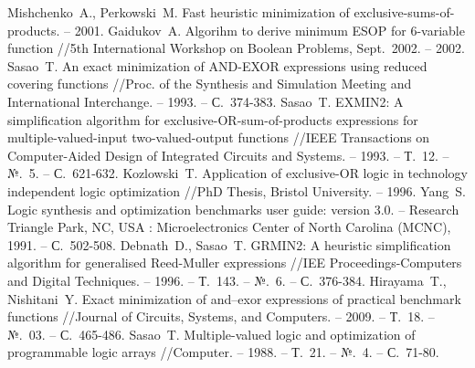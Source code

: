 \documentclass[a4paper,12pt,titlepage,finall]{article}
\begin{document}
\begin{raggedright}
\begin{thebibliography}{99}
     Mishchenko~A., Perkowski~M. Fast heuristic minimization of exclusive-sums-of-products. – 2001.
     Gaidukov~A. Algorihm to derive minimum ESOP for 6-variable function //5th International Workshop on Boolean Problems, Sept.~2002. – 2002.
     Sasao~T. An exact minimization of AND-EXOR expressions using reduced covering functions //Proc. of the Synthesis and Simulation Meeting and International Interchange. – 1993. – С.~374-383.
     Sasao~T. EXMIN2: A simplification algorithm for exclusive-OR-sum-of-products expressions for multiple-valued-input two-valued-output functions //IEEE Transactions on Computer-Aided Design of Integrated Circuits and Systems. – 1993. – Т.~12. – №.~5. – С.~621-632.
     Kozlowski~T. Application of exclusive-OR logic in technology independent logic optimization //PhD Thesis, Bristol University. – 1996.
     Yang~S. Logic synthesis and optimization benchmarks user guide: version 3.0. – Research Triangle Park, NC, USA : Microelectronics Center of North Carolina (MCNC), 1991. – С.~502-508.
     Debnath~D., Sasao~T. GRMIN2: A heuristic simplification algorithm for generalised Reed-Muller expressions //IEE Proceedings-Computers and Digital Techniques. – 1996. – Т.~143. – №.~6. – С.~376-384.
     Hirayama~T., Nishitani~Y. Exact minimization of and–exor expressions of practical benchmark functions //Journal of Circuits, Systems, and Computers. – 2009. – Т.~18. – №.~03. – С.~465-486.
     Sasao~T. Multiple-valued logic and optimization of programmable logic arrays //Computer. – 1988. – Т.~21. – №.~4. – С.~71-80.
\end{thebibliography}
\end{raggedright}
\end{document}
